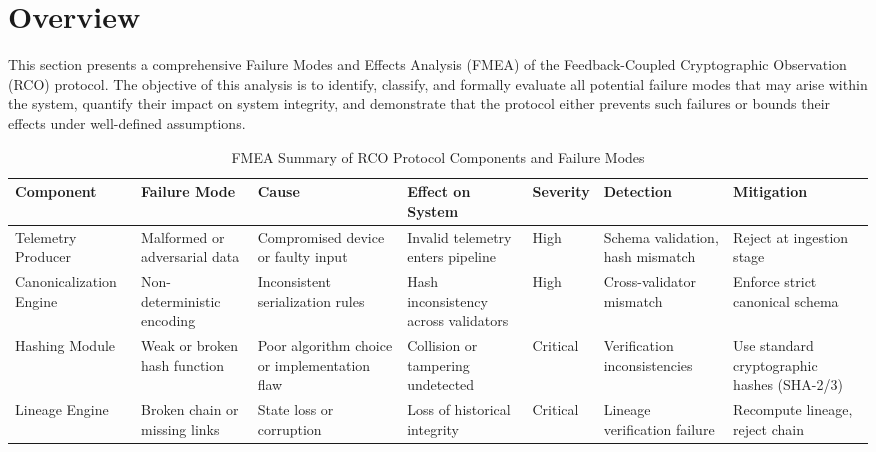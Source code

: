 \section{Overview}

This section presents a comprehensive Failure Modes and Effects Analysis (FMEA) of the Feedback-Coupled Cryptographic Observation (RCO) protocol. The objective of this analysis is to identify, classify, and formally evaluate all potential failure modes that may arise within the system, quantify their impact on system integrity, and demonstrate that the protocol either prevents such failures or bounds their effects under well-defined assumptions.

\begin{table}[htbp]
\footnotesize
\centering
\caption{FMEA Summary of RCO Protocol Components and Failure Modes}
\label{tab:fmea-summary}

\renewcommand{\arraystretch}{1.25}

\begin{tabularx}{\textwidth}{|p{2.8cm}|X|X|X|p{2cm}|p{2cm}|p{2cm}|}
\hline
\textbf{Component} & \textbf{Failure Mode} & \textbf{Cause} & \textbf{Effect on System} & \textbf{Severity} & \textbf{Detection} & \textbf{Mitigation} \\
\hline

Telemetry Producer & Malformed or adversarial data & Compromised device or faulty input & Invalid telemetry enters pipeline & High & Schema validation, hash mismatch & Reject at ingestion stage \\

\hline

Canonicalization Engine & Non-deterministic encoding & Inconsistent serialization rules & Hash inconsistency across validators & High & Cross-validator mismatch & Enforce strict canonical schema \\

\hline

Hashing Module & Weak or broken hash function & Poor algorithm choice or implementation flaw & Collision or tampering undetected & Critical & Verification inconsistencies & Use standard cryptographic hashes (SHA-2/3) \\

\hline

Lineage Engine & Broken chain or missing links & State loss or corruption & Loss of historical integrity & Critical & Lineage verification failure & Recompute lineage, reject chain \\


\end{tabularx}
\end{table}
